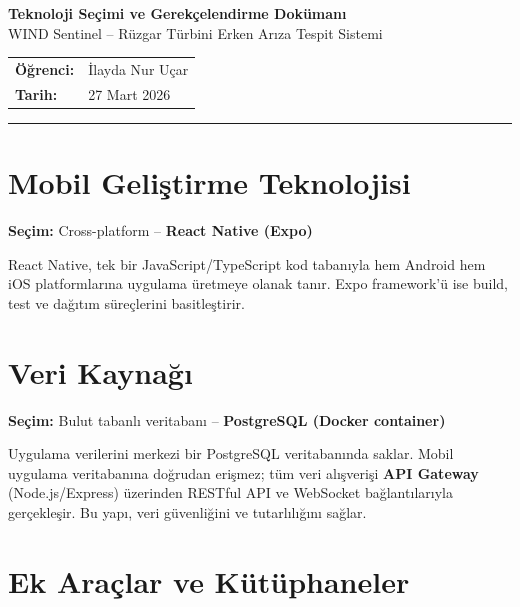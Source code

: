 \documentclass[12pt,a4paper]{article}
\begin{document}
\begin{center}
    {\LARGE\bfseries Teknoloji Se\c{c}imi ve Gerek\c{c}elendirme Dok\"uman{\i}}\\[0.5em]
    {\large WIND Sentinel -- R\"uzgar T\"urbini Erken Ar{\i}za Tespit Sistemi}\\[1em]
    \begin{tabular}{ll}
        \textbf{\"O\u{g}renci:} & {\.I}layda Nur U\c{c}ar \\
        \textbf{Tarih:} & 27 Mart 2026 \\
    \end{tabular}
\end{center}

\vspace{1em}
\hrule
\vspace{1em}

\section{Mobil Geli\c{s}tirme Teknolojisi}

\textbf{Se\c{c}im:} Cross-platform -- \textbf{React Native (Expo)}

React Native, tek bir JavaScript/TypeScript kod taban{\i}yla hem Android hem iOS platformlar{\i}na uygulama \"uretmeye olanak tan{\i}r. Expo framework'\"u ise build, test ve da\u{g}{\i}t{\i}m s\"ure\c{c}lerini basitle\c{s}tirir.

\section{Veri Kayna\u{g}{\i}}

\textbf{Se\c{c}im:} Bulut tabanl{\i} veritaban{\i} -- \textbf{PostgreSQL (Docker container)}

Uygulama verilerini merkezi bir PostgreSQL veritaban{\i}nda saklar. Mobil uygulama veritaban{\i}na do\u{g}rudan eri\c{s}mez; t\"um veri al{\i}\c{s}veri\c{s}i \textbf{API Gateway} (Node.js/Express) \"uzerinden RESTful API ve WebSocket ba\u{g}lant{\i}lar{\i}yla ger\c{c}ekle\c{s}ir. Bu yap{\i}, veri g\"uvenli\u{g}ini ve tutarl{\i}l{\i}\u{g}{\i}n{\i} sa\u{g}lar.

\section{Ek Ara\c{c}lar ve K\"ut\"uphaneler}
\end{document}
